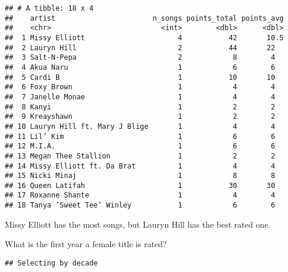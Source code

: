 \documentclass[
]{article}
\newenvironment{Shaded}{\begin{snugshade}}{\end{snugshade}}
\newcommand{\DecValTok}[1]{\textcolor[rgb]{0.00,0.00,0.81}{#1}}
\newcommand{\KeywordTok}[1]{\textcolor[rgb]{0.13,0.29,0.53}{\textbf{#1}}}
\newcommand{\NormalTok}[1]{#1}
\newcommand{\OperatorTok}[1]{\textcolor[rgb]{0.81,0.36,0.00}{\textbf{#1}}}
\newcommand{\StringTok}[1]{\textcolor[rgb]{0.31,0.60,0.02}{#1}}
\begin{document}
\begin{verbatim}
## # A tibble: 18 x 4
##    artist                       n_songs points_total points_avg
##    <chr>                          <int>        <dbl>      <dbl>
##  1 Missy Elliott                      4           42       10.5
##  2 Lauryn Hill                        2           44       22  
##  3 Salt-N-Pepa                        2            8        4  
##  4 Akua Naru                          1            6        6  
##  5 Cardi B                            1           10       10  
##  6 Foxy Brown                         1            4        4  
##  7 Janelle Monae                      1            4        4  
##  8 Kanyi                              1            2        2  
##  9 Kreayshawn                         1            2        2  
## 10 Lauryn Hill ft. Mary J Blige       1            4        4  
## 11 Lil’ Kim                           1            6        6  
## 12 M.I.A.                             1            6        6  
## 13 Megan Thee Stallion                1            2        2  
## 14 Missy Elliott ft. Da Brat          1            4        4  
## 15 Nicki Minaj                        1            8        8  
## 16 Queen Latifah                      1           30       30  
## 17 Roxanne Shante                     1            4        4  
## 18 Tanya ‘Sweet Tee’ Winley           1            6        6
\end{verbatim}

Missy Elliott has the most songs, but Lauryn Hill has the best rated
one.

What is the first year a female title is rated?

\begin{Shaded}
\end{Shaded}

\begin{verbatim}
## Selecting by decade
\end{verbatim}
\end{document}
